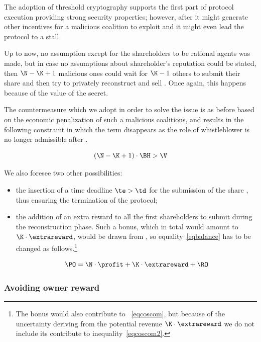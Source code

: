 The adoption of threshold cryptography supports the first part of protocol execution providing strong security properties; however, after \td it might generate other incentives for a malicious coalition to exploit and it might even lead the protocol to a stall.

Up to now, no assumption except for the shareholders to be rational agents was made, but in case no assumptions about shareholder's reputation could be stated, then $\N - \K + 1$ malicious ones could wait for $\K - 1$ others to submit their share and then try to privately reconstruct and sell \secret. Once again, this happens because of the value \V of the secret.

The countermeasure which we adopt in order to solve the issue is as before based on the economic penalization of such a malicious coalitions, and results in the following constraint in which the term \Wbonus disappears as the role of whistleblower is no longer admissible after \td.

\begin{equation}\label{eqcoscom4}
	 (\N - \K + 1) \cdot \BH  > \V
\end{equation}

We also foresee two other possibilities:

\begin{itemize}

    \item the insertion of a time deadline $\te > \td$ for the submission of the share \share, thus ensuring the termination of the protocol;

    \item the addition of an extra reward \extrareward to all the first \K shareholders to submit \share during the reconstruction phase. Such a bonus, which in total would amount to $\K \cdot \extrareward$, would be drawn from \PO, so equality~\ref{eqbalance} has to be changed as follows.\footnote{The bonus would also contribute to ~\ref{eqcoscom}, but because of the uncertainty deriving from the potential revenue $\K \cdot \extrareward$ we do not include its contribute to inequality~\ref{eqcoscom2}.}

    \begin{equation}\label{eqbalance2}
        \PO = \N \cdot \profit + \K \cdot \extrareward + \RO
    \end{equation}

\end{itemize}

\subsubsection{Avoiding owner reward}

